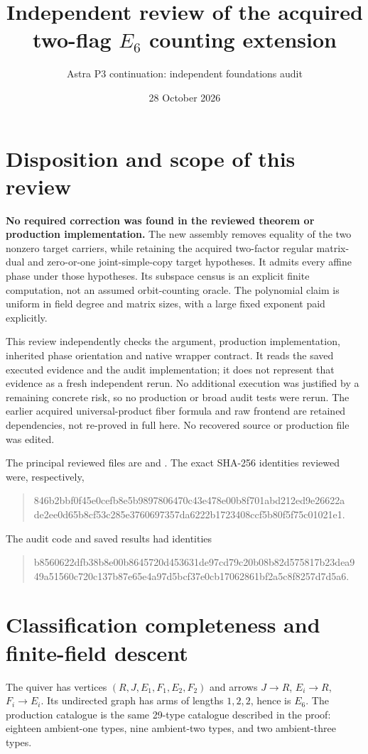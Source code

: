 \documentclass[11pt]{article}
\title{Independent review of the acquired two-flag $E_6$ counting extension}
\author{Astra P3 continuation: independent foundations audit}
\date{28 October 2026}
\begin{document}
\maketitle

\section*{Disposition and scope of this review}
\textbf{No required correction was found in the reviewed theorem or production
implementation.} The new assembly removes equality of the two nonzero target
carriers, while retaining the acquired two-factor regular matrix-dual and
zero-or-one joint-simple-copy target hypotheses. It admits every affine phase
under those hypotheses. Its subspace census is an explicit finite computation,
not an assumed orbit-counting oracle. The polynomial claim is uniform in field
degree and matrix sizes, with a large fixed exponent paid explicitly.

This review independently checks the argument, production implementation,
inherited phase orientation and native wrapper contract. It reads the saved
executed evidence and the audit implementation; it does not represent that
evidence as a fresh independent rerun. No additional execution was justified by
a remaining concrete risk, so no production or broad audit tests were rerun.
The earlier acquired universal-product fiber formula and raw frontend are
retained dependencies, not re-proved in full here. No recovered source or
production file was edited.

The principal reviewed files are
and .
The exact SHA-256 identities reviewed were, respectively,
\begin{quote}\small\ttfamily
846b2bbf0f45e0cefb8e5b9897806470c43e478e00b8f701abd212ed9e26622a\\
de2ee0d65b8cf53c285e3760697357da6222b1723408ccf5b80f5f75c01021e1.
\end{quote}
The audit code and saved results had identities
\begin{quote}\small\ttfamily
b8560622dfb38b8e00b8645720d453631de97cd79c20b08b82d575817b23dea9\\
49a51560c720c137b87e65e4a97d5bcf37e0cb17062861bf2a5c8f8257d7d5a6.
\end{quote}

\section{Classification completeness and finite-field descent}
The quiver has vertices $(R,J,E_1,F_1,E_2,F_2)$ and arrows
$J\to R$, $E_i\to R$, $F_i\to E_i$. Its undirected graph has arms
of lengths $1,2,2$, hence is $E_6$. The production catalogue is the same
29-type catalogue described in the proof: eighteen ambient-one types, nine
ambient-two types, and two ambient-three types.
\end{document}
